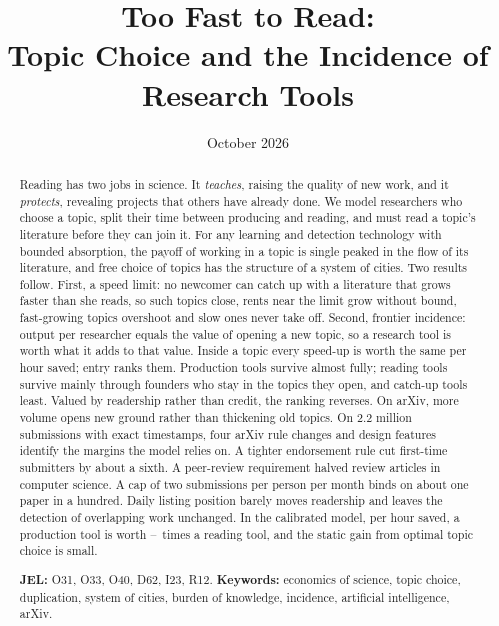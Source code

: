 \documentclass[11pt]{article}
\title{Too Fast to Read:\\Topic Choice and the Incidence of Research Tools}
\author{}
\date{October 2026}
\theoremstyle{definition}
\theoremstyle{remark}
\begin{document}
\maketitle

\begin{abstract}
\noindent Reading has two jobs in science. It \emph{teaches}, raising the quality of new work, and it \emph{protects}, revealing projects that others have already done. We model researchers who choose a topic, split their time between producing and reading, and must read a topic's literature before they can join it. For any learning and detection technology with bounded absorption, the payoff of working in a topic is single peaked in the flow of its literature, and free choice of topics has the structure of a system of cities. Two results follow. First, a speed limit: no newcomer can catch up with a literature that grows faster than she reads, so such topics close, rents near the limit grow without bound, fast-growing topics overshoot and slow ones never take off. Second, frontier incidence: output per researcher equals the value of opening a new topic, so a research tool is worth what it adds to that value. Inside a topic every speed-up is worth the same per hour saved; entry ranks them. Production tools survive almost fully; reading tools survive mainly through founders who stay in the topics they open, and catch-up tools least. Valued by readership rather than credit, the ranking reverses. On arXiv, more volume opens new ground rather than thickening old topics. On 2.2 million submissions with exact timestamps, four arXiv rule changes and design features identify the margins the model relies on. A tighter endorsement rule cut first-time submitters by about a sixth. A peer-review requirement halved review articles in computer science. A cap of two submissions per person per month binds on about one paper in a hundred. Daily listing position barely moves readership and leaves the detection of overlapping work unchanged. In the calibrated model, per hour saved, a production tool is worth \calPerHour--\calPerHourNoF\ times a reading tool, and the static gain from optimal topic choice is small.

\medskip
\noindent\textbf{JEL:} O31, O33, O40, D62, I23, R12. \quad \textbf{Keywords:} economics of science, topic choice, duplication, system of cities, burden of knowledge, incidence, artificial intelligence, arXiv.
\end{abstract}

\newpage
















\appendix




\end{document}

